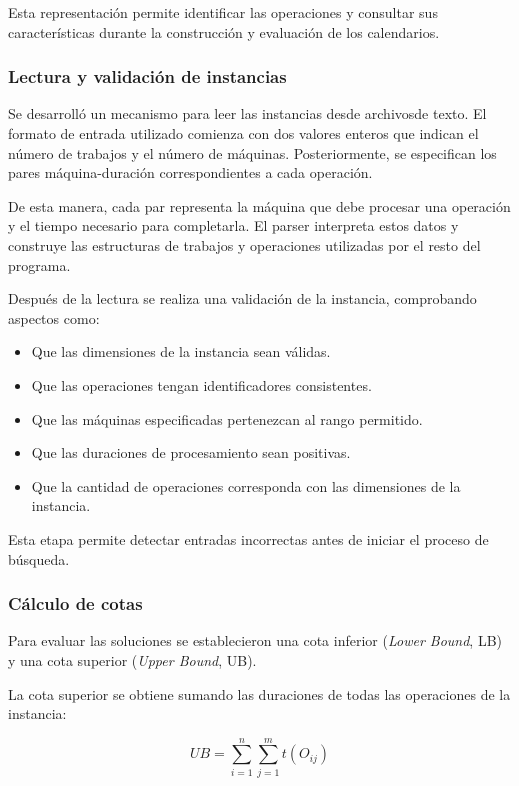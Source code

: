 \documentclass[12pt,a4paper]{article}
\begin{document}
Esta representación permite identificar las operaciones y consultar sus características durante la construcción y evaluación de los calendarios.

\subsubsection{Lectura y validación de instancias}

Se desarrolló un mecanismo para leer las instancias desde archivosde texto. El formato de entrada utilizado comienza con dos valores enteros que indican el número de trabajos y el número de máquinas. Posteriormente, se especifican los pares máquina-duración correspondientes a cada operación.

De esta manera, cada par representa la máquina que debe procesar una operación y el tiempo necesario para completarla. El parser interpreta estos datos y construye las estructuras de trabajos y operaciones utilizadas por el resto del programa.

Después de la lectura se realiza una validación de la instancia, comprobando aspectos como:

\begin{itemize}
    \item Que las dimensiones de la instancia sean válidas.
    \item Que las operaciones tengan identificadores consistentes.
    \item Que las máquinas especificadas pertenezcan al rango
    permitido.
    \item Que las duraciones de procesamiento sean positivas.
    \item Que la cantidad de operaciones corresponda con las
    dimensiones de la instancia.
\end{itemize}

Esta etapa permite detectar entradas incorrectas antes de iniciar el proceso de búsqueda.

\subsubsection{Cálculo de cotas}

Para evaluar las soluciones se establecieron una cota inferior (\textit{Lower Bound}, LB) y una cota superior (\textit{Upper Bound}, UB).

La cota superior se obtiene sumando las duraciones de todas las operaciones de la instancia:

\[
UB = \sum_{i=1}^{n}\sum_{j=1}^{m} t(O_{ij})
\]
\end{document}
